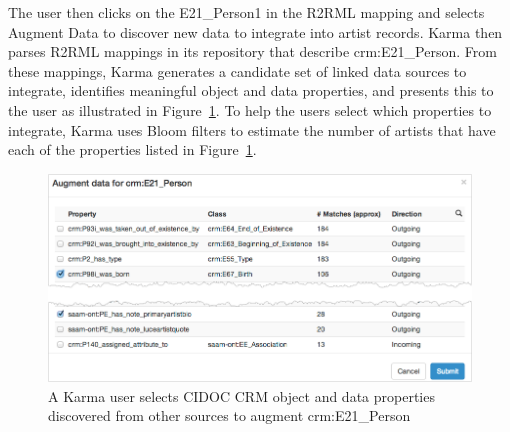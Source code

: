 The user then clicks on the E21\_Person1 in the R2RML mapping and selects Augment Data to discover new data to integrate into artist records.  
Karma then parses R2RML mappings in its repository that describe crm:E21\_Person.
From these mappings, Karma generates a candidate set of linked data sources to integrate, identifies meaningful object and data properties, and presents this to the user as illustrated in Figure~\ref{fig:search-screenshot}.
To help the users select which properties to integrate, Karma uses Bloom filters to estimate the number of artists that have each of the properties listed in Figure~\ref{fig:search-screenshot}.
\begin{figure}[t]
\centering
\includegraphics[width=4.9in]{images/5-search.png}
\vspace{-5mm}
\caption{A Karma user selects CIDOC CRM object and data properties discovered from other sources to augment crm:E21\_Person}
\vspace{-15pt}
\label{fig:search-screenshot}
\end{figure}